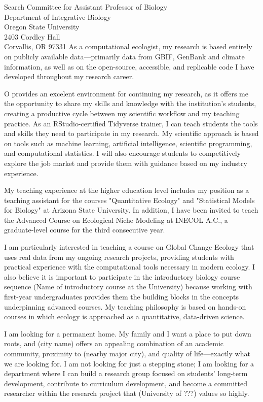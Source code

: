 \documentclass[11pt,letterpaper]{letter}  %
\begin{document}
\begin{letter}{
Search Committee for Assistant Professor of Biology\\
Department of Integrative Biology\\
Oregon State University\\
2403 Cordley Hall\\
Corvallis, OR 97331
}
As a computational ecologist, my research is based entirely on publicly available data—primarily data from GBIF, GenBank and climate information, as well as on the open-source, accessible, and replicable code I have developed throughout my research career.

O provides an excelent environment for continuing my research, as it offers me the opportunity to share my skills and knowledge with the institution’s students, creating a productive cycle between my scientific workflow and my teaching practice. As an RStudio-certified Tidyverse trainer, I can teach students the tools and skills they need to participate in my research. My scientific approach is based on tools such as machine learning, artificial intelligence, scientific programming, and computational statistics. I will also encourage students to competitively explore the job market and provide them with guidance based on my industry experience.


My teaching experience at the higher education level includes my position as a teaching assistant for the courses "Quantitative Ecology" and "Statistical Models for Biology" at Arizona State University. In addition, I have been invited to teach the Advanced Course on Ecological Niche Modeling at INECOL A.C., a graduate-level course for the third consecutive year. 

I am particularly interested in teaching a course on Global Change Ecology that uses real data from my ongoing research projects, providing students with practical experience with the computational tools necessary in modern ecology. I also believe it is important to participate in the introductory biology course sequence (Name of introductory course at the University) because working with first-year undergraduates provides them the building blocks in the concepts underpinning advanced courses. My teaching philosophy is based on hands-on courses in which ecology is approached as a quantitative, data-driven science.

I am looking for a permanent home. My family and I want a place to put down roots, and (city name) offers an appealing combination of an academic community, proximity to (nearby major city), and quality of life—exactly what we are looking for. I am not looking for just a stepping stone; I am looking for a department where I can build a research group focused on students’ long-term development, contribute to curriculum development, and become a committed researcher within the research project that (University of ???) values so highly.


\end{letter}
\end{document}
